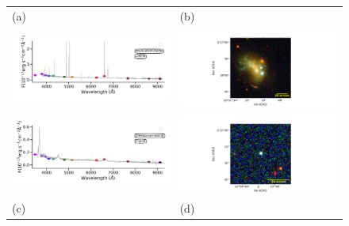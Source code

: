 \documentclass[fleqn,usenatbib]{mnras}
\begin{document}
\begin{figure}
  \setlength\tabcolsep{0pt}
  \begin{tabular}{ll}
    (a) & (b) \\
    \includegraphics[trim=10 0 10 20, clip]{Figs/spec-0331-52368-0449-SPLUS-n02s23-034336.pdf} & \includegraphics[width=0.4\linewidth, trim=10 0 10 20, clip]{Figs/SPLUS-n02s23-034336_180-1_200_r.pdf} \\
     \includegraphics[trim=10 0 10 20, clip]{Figs/spec-9152-58041-0463-STRIPE82-0147-005730.pdf} & \includegraphics[width=0.4\linewidth, trim=10 0 10 20, clip]{Figs/STRIPE82-0147-005730_343-1_100_r.pdf} \\
    (c) & (d) \\

\end{tabular}
\end{figure}
\end{document}
